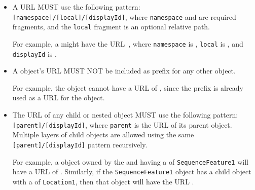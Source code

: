 \begin{itemize}

 \item A  URL MUST use the following pattern:
  \texttt{[namespace]/[local]/[displayId]},  where \texttt{namespace} and  are required fragments, and the \texttt{local} fragment is an optional relative path.
  
  	For example, a  might have the URL~, where \texttt{namespace} is , \texttt{local} is , and \texttt{displayId} is .

  \item A  object's URL MUST NOT be included as prefix for any other  object.
  
  	For example, the   object cannot have a URL of , since the  prefix is already used as a URL for the   object.

  \item The URL of any child or nested object MUST use the following pattern:\texttt{[parent]/[displayId]}, where \texttt{parent} is the URL of its parent object.
	Multiple layers of child objects are allowed using the same\\ \texttt{[parent]/[displayId]} pattern recursively.
	
	For example, a  object owned by the   and having a  of \texttt{SequenceFeature1} will have a URL of .
	Similarly, if the \texttt{SequenceFeature1} object has a  child object with a  of \texttt{Location1}, then that object will have the URL .
  \end{itemize}

